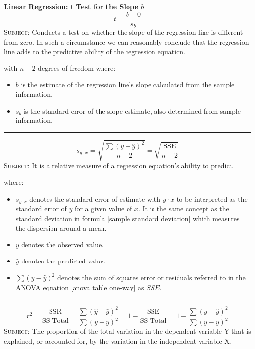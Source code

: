 \documentclass[	DIV=calc,%
							paper=a4,%
							fontsize=11pt,%
							twocolumn]{scrartcl} %
\newcommand{\hformbar}[1]{\vspace{5pt}\hrule\vspace{10pt}} %
\newcommand{\formdesc}[1]{\noindent\textbf{#1}}
\begin{document}
\formdesc{Linear Regression: t Test for the Slope $b$}
\begin{equation}
\label{linear regression test slope}
t = \frac{b - 0}{s_{b}}
\end{equation}
\textsc{Subject:} Conducts a test on whether the slope of the regression line is different from zero. In such a circumstance we can reasonably conclude that the regression line adds to the predictive ability of the regression equation.

with $n-2$ degrees of freedom where:
\begin{itemize}
 \item $b$ is the estimate of the regression line's slope calculated from the sample information.
 \item $s_{b}$ is the standard error of the slope estimate, also determined from sample information.
\end{itemize}
\hformbar


\formdesc{Linear Regression: Standard Error of Estimate}
\begin{equation}
\label{linear regression standard error of estimate}
s_{y \cdotp x} = \sqrt{\frac{\sum(y-\hat{y})^2}{n-2}} = \sqrt{\frac{\text{SSE}}{n-2}}
\end{equation}
\textsc{Subject:} It is a relative measure of a regression equation's ability to predict.

where:
\begin{itemize}
 \item $s_{y \cdotp x}$ denotes the standard error of estimate with $y \cdotp x$ to be interpreted as the standard error of $y$ for a given value of $x$. It is the same concept as the standard deviation in formula \eqref{sample standard deviation} which measures the dispersion around a mean.
 \item $y$ denotes the observed value.
 \item $\hat{y}$ denotes the predicted value.
 \item $\sum(y-\hat{y})^2$ denotes the sum of squares error or residuals referred to in the ANOVA equation \eqref{anova table one-way} as $SSE$. 
\end{itemize}
\hformbar


\formdesc{Linear Regression: Coefficient of Determination}
\begin{equation}
\label{linear regression coefficient of determination}
r^2 = \frac{\text{SSR}}{\text{SS Total}} = \frac{\sum(\hat{y}-\bar{y})^2}{\sum(y-\bar{y})^2} =  1 - \frac{\text{SSE}}{\text{SS Total}} = 1 - \frac{\sum(y-\hat{y})^2}{\sum(y-\bar{y})^2}
\end{equation}
\textsc{Subject:} The proportion of the total variation in the dependent variable Y that is explained, or accounted for, by the variation in the independent variable X.
\end{document}
